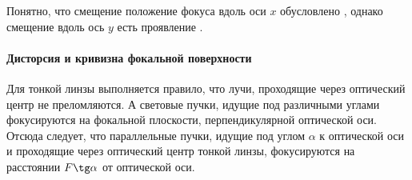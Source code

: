 Понятно, что смещение положение фокуса вдоль оси $x$ обусловлено , однако смещение вдоль ось $y$ есть проявление .

\paragraph{Дисторсия и кривизна фокальной поверхности}
Для тонкой линзы выполняется правило, что лучи, проходящие через оптический центр не преломляются. А световые пучки, идущие под различными углами фокусируются на фокальной плоскости, перпендикулярной оптической оси. Отсюда следует, что параллельные пучки, идущие под углом $\alpha$ к оптической оси и проходящие через оптический центр тонкой линзы, фокусируются на расстоянии $F \tg \alpha$ от оптической оси. 

\begin{figure}[h]
\begin{subfigure}{0.49\tw}
		\caption{}
		\label{pic:pitzval}
	\end{subfigure}
	\hfill
	\begin{subfigure}{0.49\tw}
		\caption{}
		\label{pic:distorsion-y}
	\end{subfigure}
	\caption{}
	
\end{figure}



